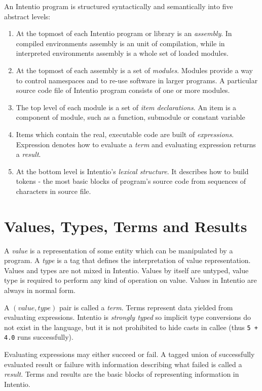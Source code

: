 An Intentio program is structured syntactically and semantically into five abstract levels:

\begin{enumerate}
  \item At the topmost of each Intentio program or library is an \emph{assembly}. In compiled environments assembly is an unit of compilation, while in interpreted environments assembly is a whole set of loaded modules.
  \item At the topmost of each assembly is a set of \emph{modules}. Modules provide a way to control namespaces and to re-use software in larger programs. A particular source code file of Intentio program consists of one or more modules.
  \item The top level of each module is a set of \emph{item declarations}. An item is a component of module, such as a function, submodule or constant variable
  \item Items which contain the real, executable code are built of \emph{expressions}. Expression denotes how to evaluate a \emph{term} and evaluating expression returns a \emph{result}.
  \item At the bottom level is Intentio's \emph{lexical structure}. It describes how to build tokens - the most basic blocks of program's source code from sequences of characters in source file.
\end{enumerate}


\section{Values, Types, Terms and Results}

A \emph{value} is a representation of some entity which can be manipulated by a program. A \emph{type} is a tag that defines the interpretation of value representation. Values and types are not mixed in Intentio. Values by itself are untyped, value type is required to perform any kind of operation on value. Values in Intentio are always in normal form.

A \((value, type)\) pair is called a \emph{term}. Terms represent data yielded from evaluating expressions. Intentio is \emph{strongly typed} so implicit type conversions do not exist in the language, but it is not prohibited to hide casts in callee (thus \lstinline{5 + 4.0} runs successfully).

Evaluating expressions may either succeed or fail. A tagged union of successfully evaluated result or failure with information describing what failed is called a \emph{result}. Terms and results are the basic blocks of representing information in Intentio.

